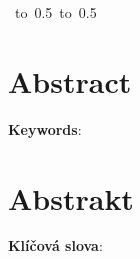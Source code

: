 \vspace{10mm}

\hbox{
  \hbox to 0.5
  \hbox to 0.5\hsize{\hfill\ThesisAuthor\hfill}
}

%
%


\vspace{20mm}
\newpage


\openright

\noindent
\Dedication

\newpage


\openright

\section*{Abstract}

\Abstract

\vspace{5mm}

\noindent\textbf{Keywords}:
\Keywords

\newpage


\openright

\section*{Abstrakt}

\CZAbstract

\vspace{5mm}

\noindent\textbf{Klíčová slova}:
\CZKeywords

%
%
%
%
%
%
%
%
%
%
%
%
%
%

\newpage

\openright
\pagestyle{plain}
\setcounter{page}{1}
